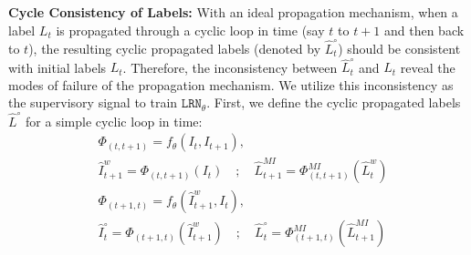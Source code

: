 \textbf{Cycle Consistency of Labels:} With an ideal propagation mechanism, when a label $L_{t}$ is propagated through a cyclic loop in time (say $t$ to $t+1$ and then back to $t$), the resulting cyclic propagated labels (denoted by $\hat{L}^{\circ}_{t}$) should be consistent with initial labels $L_{t}$. Therefore, the inconsistency between $\hat{L}^{\circ}_{t}$ and $L_t$ reveal the modes of failure of the propagation mechanism. We utilize this inconsistency as the supervisory signal to train $\mathtt{LRN}_\theta$.
First, we define the cyclic propagated labels $\hat{L}^{\circ}$ for a simple cyclic loop in time:
\begin{eqnarray}
\label{eq-cyclic-process}
    &\Phi_{(t, t+1)}  = f_\theta (I_t, I_{t+1}), \\
    &\hat{I}^{w}_{t+1} = \Phi_{(t, t+1)} (I_{t}) \quad ; \quad \hat{L}^{MI}_{t+1} = \Phi^{MI}_{(t, t+1)} ( \hat{L}^{w}_{t}) \\
    &\Phi_{(t+1, t)}  = f_\theta (\hat{I}^{w}_{t+1}, I_{t}), \\
\label{eq-cyclic}
    &\hat{I}^{\circ}_{t} = \Phi_{(t+1, t)} (\hat{I}^{w}_{t+1}) \quad ; \quad \hat{L}_{t}^{\circ} = \Phi^{MI}_{(t+1, t)} ( \hat{L}^{MI}_{t+1})
\end{eqnarray}

